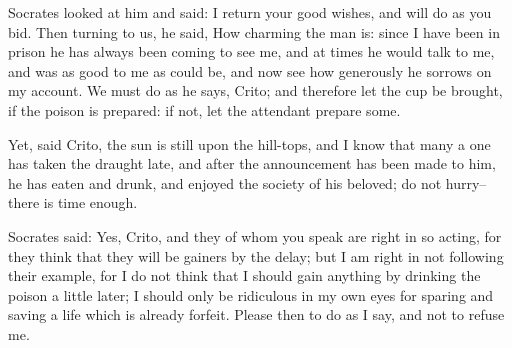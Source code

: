 Socrates looked at him and said: I return your good wishes, and will do
as you bid. Then turning to us, he said, How charming the man is: since
I have been in prison he has always been coming to see me, and at times
he would talk to me, and was as good to me as could be, and now see how
generously he sorrows on my account. We must do as he says, Crito; and
therefore let the cup be brought, if the poison is prepared: if not, let
the attendant prepare some.

Yet, said Crito, the sun is still upon the hill-tops, and I know that
many a one has taken the draught late, and after the announcement has
been made to him, he has eaten and drunk, and enjoyed the society of his
beloved; do not hurry--there is time enough.

Socrates said: Yes, Crito, and they of whom you speak are right in so
acting, for they think that they will be gainers by the delay; but I am
right in not following their example, for I do not think that I should
gain anything by drinking the poison a little later; I should only be
ridiculous in my own eyes for sparing and saving a life which is already
forfeit. Please then to do as I say, and not to refuse me.

